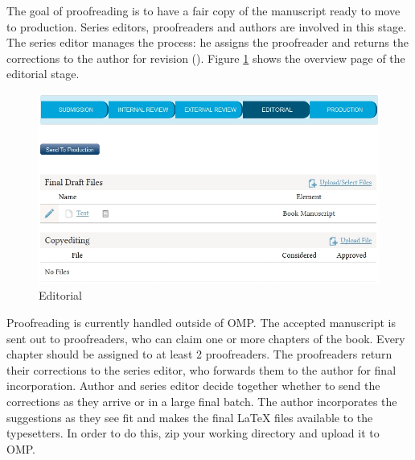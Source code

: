 The goal of proofreading is to have a fair copy of the manuscript ready to move to production. Series editors, proofreaders and authors are involved in this stage. The series editor manages the process: he assigns the proofreader and returns the corrections to the author for revision (). Figure \ref{fig:editorial} shows the overview page of the editorial stage. 

\begin{figure}[h] \centering
\includegraphics[width=1\textwidth]{./img/editorial.jpg} \caption{Editorial}
\label{fig:editorial}
\end{figure}

Proofreading is currently handled outside of OMP. The accepted manuscript is sent out to proofreaders, who can claim one or more chapters of the book. Every chapter should be assigned to at least 2 proofreaders. The proofreaders return their corrections to the series editor, who forwards them to the author for final incorporation. Author and series editor decide together whether to send the corrections as they arrive or in a large final batch. The author incorporates the suggestions as they see fit and makes the final {\LaTeX} files available to the typesetters. In order to do this, zip your working directory and upload it to OMP.



